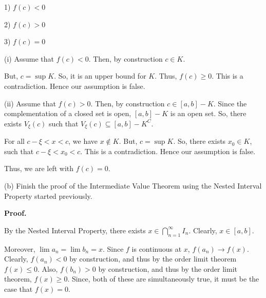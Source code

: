 \documentclass[10pt]{article}
\begin{document}
1) $\displaystyle f( c) < 0$ 

2) $\displaystyle f( c)  >0$

3) $\displaystyle f( c) =0$



(i) Assume that $\displaystyle f( c) < 0$. Then, by construction $\displaystyle c\in K$. 



But, $\displaystyle c=\sup K$. So, it is an upper bound for $\displaystyle K$. Thus, $\displaystyle f( c) \geq 0$. This is a contradiction. Hence our assumption is false.



(ii) Assume that $\displaystyle f( c)  >0$. Then, by construction $\displaystyle c\in [ a,b] -K$. Since the complementation of a closed set is open, $\displaystyle [ a,b] -K$ is an open set. So, there exists $\displaystyle V_{\xi }( c)$ such that $\displaystyle V_{\xi }( c) \subseteq [ a,b] -K^{C}$. 



For all $\displaystyle c-\xi < x< c$, we have $\displaystyle x\notin K$. But, $\displaystyle c=\sup K$. So, there exists $\displaystyle x_{0} \in K$, such that $\displaystyle c-\xi < x_{0} < c$. This is a contradiction. Hence our assumption is false.



Thus, we are left with $\displaystyle f( c) =0$.



(b) Finish the proof of the Intermediate Value Theorem using the Nested Interval Property started previously.



\textbf{Proof.}



By the Nested Interval Property, there exists $\displaystyle x\in \bigcap _{n=1}^{\infty } I_{n}$. Clearly, $\displaystyle x\in [ a,b]$. 



Moreover, $\displaystyle \lim a_{n} =\lim b_{n} =x$. Since $\displaystyle f$ is continuous at $\displaystyle x$, $\displaystyle f( a_{n})\rightarrow f( x)$. Clearly, $\displaystyle f( a_{n}) < 0$ by construction, and thus by the order limit theorem $\displaystyle f( x) \leq 0$. Also, $\displaystyle f( b_{n})  >0$ by construction, and thus by the order limit theorem, $\displaystyle f( x) \geq 0$. Since, both of these are simultaneously true, it must be the case that $\displaystyle f( x) =0$. 
\end{document}
